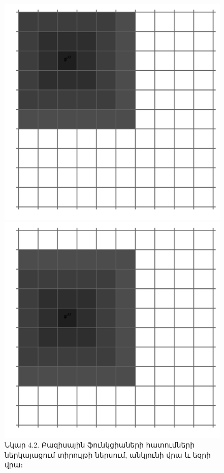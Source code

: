 \documentclass[fleqn, bachelor,subf,12pt,notitlepage]{article}
\begin{document}
\begin{figure}[H]
\begin{minipage}[b]{0.2\textwidth}
    \includegraphics[width=\textwidth]{images/two_dimensional_basis_intersection_edge_1}
  \end{minipage}
\hfill
  \begin{minipage}[b]{0.2\textwidth}
    \includegraphics[width=\textwidth]{images/two_dimensional_basis_intersection_edge_2}
  \end{minipage}
\captionsetup{labelformat=empty}
\caption{Նկար 4.2. Բազիսային ֆունկցիաների հատումների ներկայացում տիրույթի ներսում, անկյունի վրա և եզրի վրա։}
\end{figure}
\end{document}
